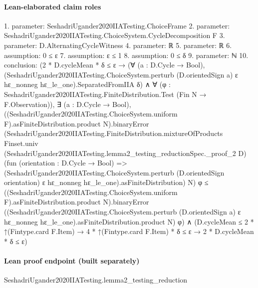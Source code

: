 \documentclass[10pt]{article}
\begin{document}
\paragraph{Lean-elaborated claim roles}\begin{ReviewVerbatim}
1. parameter: SeshadriUgander2020IIATesting.ChoiceFrame
2. parameter: SeshadriUgander2020IIATesting.ChoiceSystem.CycleDecomposition F
3. parameter: D.AlternatingCycleWitness
4. parameter: ℝ
5. parameter: ℝ
6. assumption: 0 ≤ ε
7. assumption: ε ≤ 1
8. assumption: 0 ≤ δ
9. parameter: ℕ
10. conclusion: (2 * D.cycleMean * δ ≤ ε →
    (∀ (a : D.Cycle → Bool),
        (SeshadriUgander2020IIATesting.ChoiceSystem.perturb (D.orientedSign a) ε hε_nonneg hε_le_one).SeparatedFromIIA
          δ) ∧
      ∀ (φ : SeshadriUgander2020IIATesting.FiniteDistribution.Test (Fin N → F.Observation)),
        ∃ (a : D.Cycle → Bool),
          ((SeshadriUgander2020IIATesting.ChoiceSystem.uniform F).asFiniteDistribution.product N).binaryError
              (SeshadriUgander2020IIATesting.FiniteDistribution.mixtureOfProducts Finset.univ
                (SeshadriUgander2020IIATesting.lemma2_testing_reductionSpec._proof_2 D)
                (fun (orientation : D.Cycle → Bool) =>
                  (SeshadriUgander2020IIATesting.ChoiceSystem.perturb (D.orientedSign orientation) ε hε_nonneg
                      hε_le_one).asFiniteDistribution)
                N)
              φ ≤
            ((SeshadriUgander2020IIATesting.ChoiceSystem.uniform F).asFiniteDistribution.product N).binaryError
              ((SeshadriUgander2020IIATesting.ChoiceSystem.perturb (D.orientedSign a) ε hε_nonneg
                      hε_le_one).asFiniteDistribution.product
                N)
              φ) ∧
  (D.cycleMean ≤ 2 * ↑(Fintype.card F.Item) → 4 * ↑(Fintype.card F.Item) * δ ≤ ε → 2 * D.cycleMean * δ ≤ ε)
\end{ReviewVerbatim}

\paragraph{Lean proof endpoint (built separately)}\begin{ReviewVerbatim}
SeshadriUgander2020IIATesting.lemma2_testing_reduction
\end{ReviewVerbatim}
\end{document}
